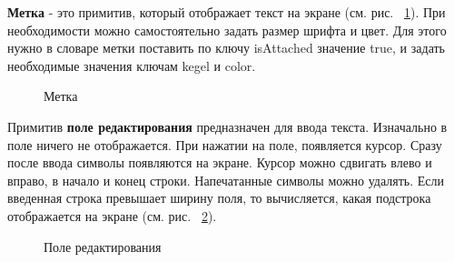 \documentclass[14pt]{extarticle}
\begin{document}
		\textbf{Метка} - это примитив, который отображает текст на экране (см. рис. ~\ref{labelField}). При необходимости можно самостоятельно задать размер шрифта и цвет. Для этого нужно в словаре метки поставить по ключу isAttached значение true, и задать необходимые значения ключам kegel и color. 
		\begin{figure}[h]
		\caption{ Метка }
		\label{labelField}
		\end{figure}	

		Примитив \textbf{поле редактирования} предназначен для ввода текста. Изначально в поле ничего не отображается. При нажатии на поле, появляется курсор. Сразу после ввода символы появляются на экране. Курсор можно сдвигать влево и вправо, в начало и конец строки. Напечатанные символы можно удалять. Если введенная строка превышает ширину поля, то вычисляется, какая подстрока отображается на экране (см. рис. ~\ref{textField}).
		\begin{figure}[h!]
		\caption{ Поле редактирования }
		\label{textField}
		\end{figure}	
		
\end{document}
